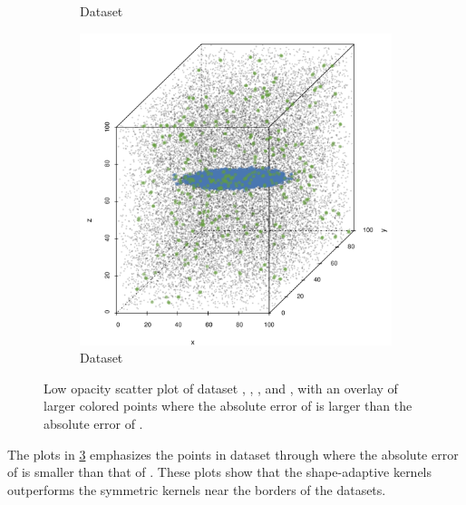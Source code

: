 \begin{figure}
\begin{subfigure}{0.23\textwidth}
			\caption{Dataset \baakmanFour}
			\label{fig:discussion:performance:mbeLowerError:baakman4}
		\end{subfigure}		
		\begin{subfigure}{0.23\textwidth}
			\centering
			\includegraphics[keepaspectratio=true, width=\textwidth, height=0.23\textheight]{discussion/img/baakman_5_abs_error_mbeSmallerThansambe}
			\caption{Dataset \baakmanFive}
			\label{fig:discussion:performance:mbeLowerError:baakman5}
		\end{subfigure}			
		\caption{Low opacity scatter plot of dataset %
			 \ferdosiOne, %
			 \baakmanOne, %
			 \baakmanFour, and%
			 \baakmanFive, %
			with an overlay of larger colored points where the absolute error of \sambe is larger than the absolute error of \mbe.}
		\label{fig:discussion:performance:singleSphere:mbeLowerError}
	\end{figure}
	The plots in \cref{fig:discussion:performance:singleSphere:mbeLowerError} emphasizes the points in dataset \ferdosiOne through \baakmanOne where the absolute error of \mbe is smaller than that of \sambe. These plots show that the shape-adaptive kernels outperforms the symmetric kernels near the borders of the datasets.
